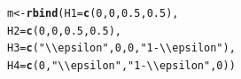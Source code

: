 \documentclass[a4paper, 10pt]{article}\usepackage[]{graphicx}\usepackage[]{color}
\makeatletter
\newcommand{\hlnum}[1]{\textcolor[rgb]{0.686,0.059,0.569}{#1}}%
\newcommand{\hlstr}[1]{\textcolor[rgb]{0.192,0.494,0.8}{#1}}%
\newcommand{\hlstd}[1]{\textcolor[rgb]{0.345,0.345,0.345}{#1}}%
\newcommand{\hlkwb}[1]{\textcolor[rgb]{0.69,0.353,0.396}{#1}}%
\newcommand{\hlkwc}[1]{\textcolor[rgb]{0.333,0.667,0.333}{#1}}%
\newcommand{\hlkwd}[1]{\textcolor[rgb]{0.737,0.353,0.396}{\textbf{#1}}}%
\newenvironment{kframe}{%
 \def\at@end@of@kframe{}%
 \ifinner\ifhmode%
  \def\at@end@of@kframe{\end{minipage}}%
  \begin{minipage}{\columnwidth}%
 \fi\fi%
 \def\FrameCommand##1{\hskip\@totalleftmargin \hskip-\fboxsep
 \colorbox{shadecolor}{##1}\hskip-\fboxsep
     \hskip-\linewidth \hskip-\@totalleftmargin \hskip\columnwidth}%
 \MakeFramed {\advance\hsize-\width
   \@totalleftmargin\z@ \linewidth\hsize
   \@setminipage}}%
 {\par\unskip\endMakeFramed%
 \at@end@of@kframe}
\newenvironment{knitrout}{}{} %
\numberwithin{equation}{section}
\theoremstyle{definition}
\theoremstyle{plain}
\makeatother
\begin{document}
\begin{knitrout}\footnotesize
{}\color{fgcolor}\begin{kframe}
\begin{alltt}
\hlstd{m} \hlkwb{<-} \hlkwd{rbind}\hlstd{(}\hlkwc{H1}\hlstd{=}\hlkwd{c}\hlstd{(}\hlnum{0}\hlstd{,}           \hlnum{0}\hlstd{,}           \hlnum{0.5}\hlstd{,}           \hlnum{0.5}          \hlstd{),}
           \hlkwc{H2}\hlstd{=}\hlkwd{c}\hlstd{(}\hlnum{0}\hlstd{,}           \hlnum{0}\hlstd{,}           \hlnum{0.5}\hlstd{,}           \hlnum{0.5}          \hlstd{),}
           \hlkwc{H3}\hlstd{=}\hlkwd{c}\hlstd{(}\hlstr{"\textbackslash{}\textbackslash{}epsilon"}\hlstd{,} \hlnum{0}\hlstd{,}           \hlnum{0}\hlstd{,}             \hlstr{"1-\textbackslash{}\textbackslash{}epsilon"}\hlstd{),}
           \hlkwc{H4}\hlstd{=}\hlkwd{c}\hlstd{(}\hlnum{0}\hlstd{,}           \hlstr{"\textbackslash{}\textbackslash{}epsilon"}\hlstd{,} \hlstr{"1-\textbackslash{}\textbackslash{}epsilon"}\hlstd{,} \hlnum{0}            \hlstd{))}


\end{alltt}
\end{kframe}
\end{knitrout}
\end{document}
